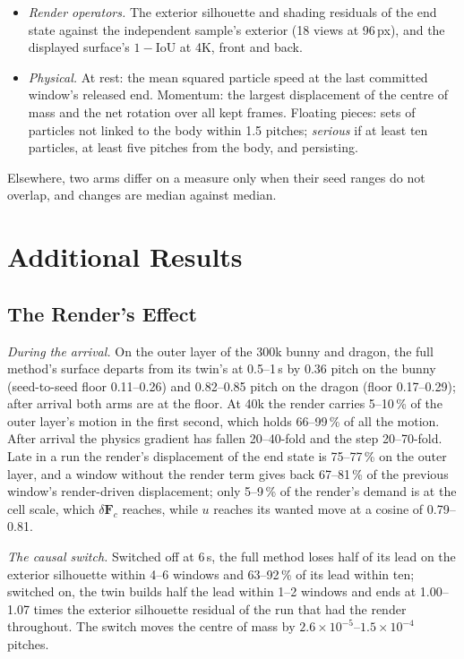 \begin{itemize}
  \item \emph{Render operators.} The exterior silhouette and shading residuals of the end state against the independent
        sample's exterior (18 views at 96\,px), and the displayed surface's $1-\mathrm{IoU}$ at 4K, front and back.
  \item \emph{Physical.} At rest: the mean squared particle speed at the last committed window's released end. Momentum: the
        largest displacement of the centre of mass and the net rotation over all kept frames. Floating pieces: sets of
        particles not linked to the body within 1.5 pitches; \emph{serious} if at least ten particles, at least five pitches
        from the body, and persisting.
\end{itemize}
Elsewhere, two arms differ on a measure only when their seed ranges do not overlap, and changes are median against median.

\section{Additional Results}
\label{app:ch4_results}

\subsection{The Render's Effect}
\textit{During the arrival.} On the outer layer of the 300k bunny and dragon, the full method's surface departs from its
twin's at 0.5--1\,s by 0.36 pitch on the bunny (seed-to-seed floor 0.11--0.26) and 0.82--0.85 pitch on the dragon (floor
0.17--0.29); after arrival both arms are at the floor. At 40k the render carries 5--10\,\% of the outer layer's motion in the
first second, which holds 66--99\,\% of all the motion. After arrival the physics gradient has fallen 20--40-fold and the step
20--70-fold. Late in a run the render's displacement of the end state is 75--77\,\% on the outer layer, and a window without
the render term gives back 67--81\,\% of the previous window's render-driven displacement; only 5--9\,\% of the render's demand
is at the cell scale, which $\delta\mathbf{F}_c$ reaches, while $u$ reaches its wanted move at a cosine of 0.79--0.81.

\textit{The causal switch.} Switched off at 6\,s, the full method loses half of its lead on the exterior silhouette within 4--6
windows and 63--92\,\% of its lead within ten; switched on, the twin builds half the lead within 1--2 windows and ends at
1.00--1.07 times the exterior silhouette residual of the run that had the render throughout. The switch moves the centre of
mass by $2.6\times10^{-5}$--$1.5\times10^{-4}$ pitches.

